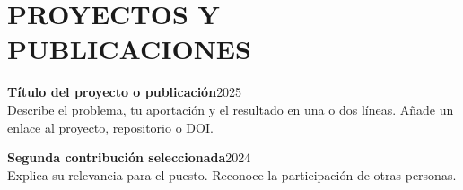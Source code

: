 \section{PROYECTOS Y PUBLICACIONES}
\textbf{Título del proyecto o publicación}\hfill{\small 2025}\\
Describe el problema, tu aportación y el resultado en una o dos líneas.
Añade un \href{https://example.com}{enlace al proyecto, repositorio o DOI}.\par
\vspace{3pt}
\textbf{Segunda contribución seleccionada}\hfill{\small 2024}\\
Explica su relevancia para el puesto. Reconoce la participación de otras personas.
